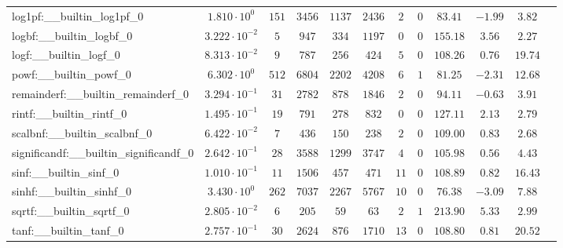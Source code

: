 \begin{tabular}{|l|c|c|c|c|c|c|c|c|c|c|c|}
log1pf:\_\_builtin\_log1pf\_0             & $ 1.810 \cdot 10^{0}  $ & $ 151    $ & $ 3456   $ & $ 1137  $ & $ 2436  $ & $ 2   $ & $ 0 $ & $ 83.41       $ & $ -1.99   $ & $ 3.82    $ \\
logbf:\_\_builtin\_logbf\_0               & $ 3.222 \cdot 10^{-2} $ & $ 5      $ & $ 947    $ & $ 334   $ & $ 1197  $ & $ 0   $ & $ 0 $ & $ 155.18      $ & $ 3.56    $ & $ 2.27    $ \\
logf:\_\_builtin\_logf\_0                 & $ 8.313 \cdot 10^{-2} $ & $ 9      $ & $ 787    $ & $ 256   $ & $ 424   $ & $ 5   $ & $ 0 $ & $ 108.26      $ & $ 0.76    $ & $ 19.74   $ \\
powf:\_\_builtin\_powf\_0                 & $ 6.302 \cdot 10^{0}  $ & $ 512    $ & $ 6804   $ & $ 2202  $ & $ 4208  $ & $ 6   $ & $ 1 $ & $ 81.25       $ & $ -2.31   $ & $ 12.68   $ \\
remainderf:\_\_builtin\_remainderf\_0     & $ 3.294 \cdot 10^{-1} $ & $ 31     $ & $ 2782   $ & $ 878   $ & $ 1846  $ & $ 2   $ & $ 0 $ & $ 94.11       $ & $ -0.63   $ & $ 3.91    $ \\
rintf:\_\_builtin\_rintf\_0               & $ 1.495 \cdot 10^{-1} $ & $ 19     $ & $ 791    $ & $ 278   $ & $ 832   $ & $ 0   $ & $ 0 $ & $ 127.11      $ & $ 2.13    $ & $ 2.79    $ \\
scalbnf:\_\_builtin\_scalbnf\_0           & $ 6.422 \cdot 10^{-2} $ & $ 7      $ & $ 436    $ & $ 150   $ & $ 238   $ & $ 2   $ & $ 0 $ & $ 109.00      $ & $ 0.83    $ & $ 2.68    $ \\
significandf:\_\_builtin\_significandf\_0 & $ 2.642 \cdot 10^{-1} $ & $ 28     $ & $ 3588   $ & $ 1299  $ & $ 3747  $ & $ 4   $ & $ 0 $ & $ 105.98      $ & $ 0.56    $ & $ 4.43    $ \\
sinf:\_\_builtin\_sinf\_0                 & $ 1.010 \cdot 10^{-1} $ & $ 11     $ & $ 1506   $ & $ 457   $ & $ 471   $ & $ 11  $ & $ 0 $ & $ 108.89      $ & $ 0.82    $ & $ 16.43   $ \\
sinhf:\_\_builtin\_sinhf\_0               & $ 3.430 \cdot 10^{0}  $ & $ 262    $ & $ 7037   $ & $ 2267  $ & $ 5767  $ & $ 10  $ & $ 0 $ & $ 76.38       $ & $ -3.09   $ & $ 7.88    $ \\
sqrtf:\_\_builtin\_sqrtf\_0               & $ 2.805 \cdot 10^{-2} $ & $ 6      $ & $ 205    $ & $ 59    $ & $ 63    $ & $ 2   $ & $ 1 $ & $ 213.90      $ & $ 5.33    $ & $ 2.99    $ \\
tanf:\_\_builtin\_tanf\_0                 & $ 2.757 \cdot 10^{-1} $ & $ 30     $ & $ 2624   $ & $ 876   $ & $ 1710  $ & $ 13  $ & $ 0 $ & $ 108.80      $ & $ 0.81    $ & $ 20.52   $ \\

\end{tabular}
